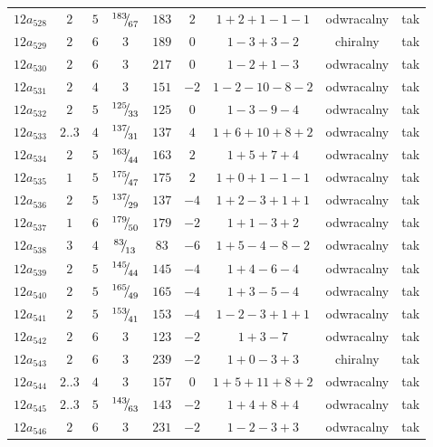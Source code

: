 \begin{longtable}{ccccccccc}
$12a_{528}$ & $2$ & $5$ & ${}^{183}{\mskip -5mu/\mskip -3mu}_{67}$ & $183$ & $2$ & $1+2+1-1-1$ & odwracalny & tak \\
$12a_{529}$ & $2$ & $6$ & $3$ & $189$ & $0$ & $1-3+3-2$ & chiralny & tak \\
$12a_{530}$ & $2$ & $6$ & $3$ & $217$ & $0$ & $1-2+1-3$ & odwracalny & tak \\
$12a_{531}$ & $2$ & $4$ & $3$ & $151$ & $-2$ & $1-2-10-8-2$ & odwracalny & tak \\
$12a_{532}$ & $2$ & $5$ & ${}^{125}{\mskip -5mu/\mskip -3mu}_{33}$ & $125$ & $0$ & $1-3-9-4$ & odwracalny & tak \\
$12a_{533}$ & $2..3$ & $4$ & ${}^{137}{\mskip -5mu/\mskip -3mu}_{31}$ & $137$ & $4$ & $1+6+10+8+2$ & odwracalny & tak \\
$12a_{534}$ & $2$ & $5$ & ${}^{163}{\mskip -5mu/\mskip -3mu}_{44}$ & $163$ & $2$ & $1+5+7+4$ & odwracalny & tak \\
$12a_{535}$ & $1$ & $5$ & ${}^{175}{\mskip -5mu/\mskip -3mu}_{47}$ & $175$ & $2$ & $1+0+1-1-1$ & odwracalny & tak \\
$12a_{536}$ & $2$ & $5$ & ${}^{137}{\mskip -5mu/\mskip -3mu}_{29}$ & $137$ & $-4$ & $1+2-3+1+1$ & odwracalny & tak \\
$12a_{537}$ & $1$ & $6$ & ${}^{179}{\mskip -5mu/\mskip -3mu}_{50}$ & $179$ & $-2$ & $1+1-3+2$ & odwracalny & tak \\
$12a_{538}$ & $3$ & $4$ & ${}^{83}{\mskip -5mu/\mskip -3mu}_{13}$ & $83$ & $-6$ & $1+5-4-8-2$ & odwracalny & tak \\
$12a_{539}$ & $2$ & $5$ & ${}^{145}{\mskip -5mu/\mskip -3mu}_{44}$ & $145$ & $-4$ & $1+4-6-4$ & odwracalny & tak \\
$12a_{540}$ & $2$ & $5$ & ${}^{165}{\mskip -5mu/\mskip -3mu}_{49}$ & $165$ & $-4$ & $1+3-5-4$ & odwracalny & tak \\
$12a_{541}$ & $2$ & $5$ & ${}^{153}{\mskip -5mu/\mskip -3mu}_{41}$ & $153$ & $-4$ & $1-2-3+1+1$ & odwracalny & tak \\
$12a_{542}$ & $2$ & $6$ & $3$ & $123$ & $-2$ & $1+3-7$ & odwracalny & tak \\
$12a_{543}$ & $2$ & $6$ & $3$ & $239$ & $-2$ & $1+0-3+3$ & chiralny & tak \\
$12a_{544}$ & $2..3$ & $4$ & $3$ & $157$ & $0$ & $1+5+11+8+2$ & odwracalny & tak \\
$12a_{545}$ & $2..3$ & $5$ & ${}^{143}{\mskip -5mu/\mskip -3mu}_{63}$ & $143$ & $-2$ & $1+4+8+4$ & odwracalny & tak \\
$12a_{546}$ & $2$ & $6$ & $3$ & $231$ & $-2$ & $1-2-3+3$ & odwracalny & tak \\

\end{longtable}
